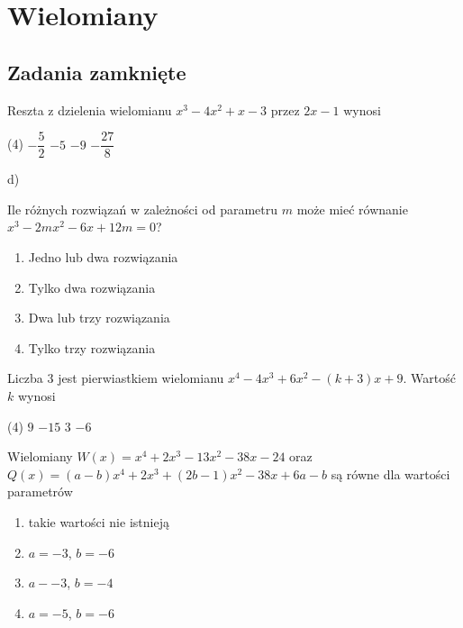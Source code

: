 \setcounter{parc}{0}
\addtocounter{chapc}{1}

\chapter{Wielomiany}

\section{Zadania zamknięte}
\begin{zadania}
	\begin{zad} 
		Reszta z dzielenia wielomianu $x^3 - 4x^2 + x -3$ przez $2x - 1$ wynosi
		\begin{tasks}(4)
			\task $-\dfrac{5}{2}$
			\task $-5$
			\task $-9$
			\task $-\dfrac{27}{8}$ %
		\end{tasks}
		\begin{sol}
			d)
		\end{sol}
	\end{zad}
\end{zadania}

\zadanie Ile różnych rozwiązań w zależności od parametru $m$ może mieć równanie $x^3 - 2mx^2 - 6x + 12m = 0$?
\begin{enumerate}[label=\alph*)]
	\item Jedno lub dwa rozwiązania
	\item Tylko dwa rozwiązania
	\item Dwa lub trzy rozwiązania %
	\item Tylko trzy rozwiązania
\end{enumerate}

\zadanie Liczba $3$ jest pierwiastkiem wielomianu ${x^4 - 4x^3 + 6x^2 - (k + 3)x + 9}$. Wartość $k$ wynosi
\begin{tasks}(4)
	\task $9$ %
	\task $-15$
	\task $3$
	\task $-6$
\end{tasks}

\newpage

\zadanie Wielomiany $W(x) = x^4 + 2x^3 - 13x^2 - 38x - 24$ oraz\\ ${Q(x) = (a - b)x^4 + 2x^3 +(2b - 1)x^2 -38x +6a - b}$ są równe dla wartości parametrów
\begin{enumerate}[label=\alph*)]
	\item takie wartości nie istnieją
	\item $a = -3$, $b = -6$
	\item $a - -3$, $b = -4$
	\item $a = -5$, $b = -6$ %
\end{enumerate}

